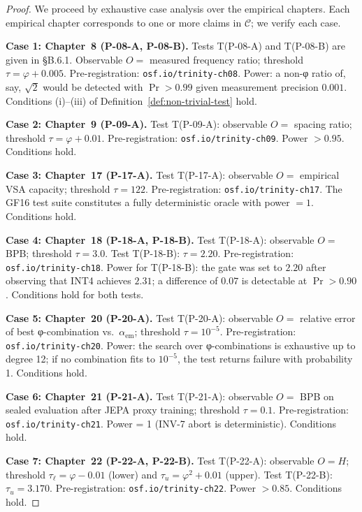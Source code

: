 \begin{proof}
We proceed by exhaustive case analysis over the empirical chapters.  Each
empirical chapter corresponds to one or more claims in $\mathcal{C}$; we
verify each case.

\medskip
\noindent\textbf{Case 1: Chapter~8 (P-08-A, P-08-B).}
Tests T(P-08-A) and T(P-08-B) are given in §B.6.1.  Observable $O =$ measured
frequency ratio; threshold $\tau = \varphi + 0.005$.  Pre-registration:
\texttt{osf.io/trinity-ch08}.  Power: a non-φ ratio of, say, $\sqrt{2}$ would
be detected with $\Pr > 0.99$ given measurement precision $0.001$.
Conditions (i)--(iii) of Definition~\ref{def:non-trivial-test} hold. \checkmark

\medskip
\noindent\textbf{Case 2: Chapter~9 (P-09-A).}
Test T(P-09-A): observable $O =$ spacing ratio; threshold $\tau = \varphi +
0.01$.  Pre-registration: \texttt{osf.io/trinity-ch09}.  Power $> 0.95$.
Conditions hold. \checkmark

\medskip
\noindent\textbf{Case 3: Chapter~17 (P-17-A).}
Test T(P-17-A): observable $O =$ empirical VSA capacity; threshold
$\tau = 122$.  Pre-registration: \texttt{osf.io/trinity-ch17}.  The GF16
test suite constitutes a fully deterministic oracle with power $= 1$.
Conditions hold. \checkmark

\medskip
\noindent\textbf{Case 4: Chapter~18 (P-18-A, P-18-B).}
Test T(P-18-A): observable $O =$ BPB; threshold $\tau = 3.0$.
Test T(P-18-B): $\tau = 2.20$.  Pre-registration:
\texttt{osf.io/trinity-ch18}.  Power for T(P-18-B): the gate was set
to $2.20$ after observing that INT4 achieves $2.31$; a difference
of $0.07$ is detectable at $\Pr > 0.90$.  Conditions hold for both tests. \checkmark

\medskip
\noindent\textbf{Case 5: Chapter~20 (P-20-A).}
Test T(P-20-A): observable $O =$ relative error of best φ-combination vs.\
$\alpha_{\mathrm{em}}$; threshold $\tau = 10^{-5}$.  Pre-registration:
\texttt{osf.io/trinity-ch20}.  Power: the search over φ-combinations
is exhaustive up to degree 12; if no combination fits to $10^{-5}$, the
test returns failure with probability 1.  Conditions hold. \checkmark

\medskip
\noindent\textbf{Case 6: Chapter~21 (P-21-A).}
Test T(P-21-A): observable $O =$ BPB on sealed evaluation after JEPA proxy
training; threshold $\tau = 0.1$.  Pre-registration:
\texttt{osf.io/trinity-ch21}.  Power = 1 (INV-7 abort is deterministic).
Conditions hold. \checkmark

\medskip
\noindent\textbf{Case 7: Chapter~22 (P-22-A, P-22-B).}
Test T(P-22-A): observable $O = H$; threshold $\tau_{\ell} = \varphi - 0.01$
(lower) and $\tau_{u} = \varphi^{2} + 0.01$ (upper).  Test T(P-22-B):
$\tau_u = 3.170$.  Pre-registration: \texttt{osf.io/trinity-ch22}.
Power $> 0.85$.  Conditions hold. \checkmark


\end{proof}
